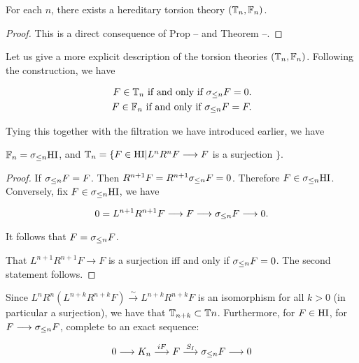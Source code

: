 \begin{cor}
For each $n$, there exists a hereditary torsion theory $(\mathbb{T}_n, 
\mathbb{F}_n)$.
\end{cor}

\begin{proof}
This is a direct consequence of Prop -- and Theorem --.
\end{proof}

Let us give a more explicit description of the torsion theories 
$(\mathbb{T}_n, \mathbb{F}_n)$. Following the construction, we have

\begin{align*}\label{f0}
F \in \mathbb{T}_n \textrm{ if and only if } \sigma_{\leq n} F = 0. \\
F \in \mathbb{F}_n \textrm{ if and only if } \sigma_{\leq n} F = F.
\end{align*}

Tying this together with the filtration we have introduced 
earlier, we have

\begin{prop}
$\mathbb{F}_n = \sigma_{\leq n} \mathrm{HI}$, and $\mathbb{T}_n = \{F \in \mathrm{HI} | L^nR^nF 
\longrightarrow F$ is a surjection $\}$.
\end{prop}

\begin{proof}
If $\sigma_{\leq n}F = F$. Then $R^{n+1}F=R^{n+1}\sigma_{\leq n}F=0$. Therefore 
$F \in \sigma_{\leq n} \mathrm{HI}$. Conversely, fix $F \in \sigma_{\leq n} \mathrm{HI}$, we have

\begin{equation}
0 = L^{n+1}R^{n+1}F \longrightarrow F \longrightarrow \sigma_{\leq n}F 
\longrightarrow 0.
\end{equation}

It follows that $F= \sigma_{\leq n}F$.

That $L^{n+1}R^{n+1}F \longrightarrow F$ is a surjection iff and 
only if $\sigma_{\leq n}F = 0$. The second statement follows.
\end{proof}

Since $L^nR^n(L^{n+k}R^{n+k}F) \stackrel{\sim}{\longrightarrow}
L^{n+k}R^{n+k} F$ is an isomorphism for all $k > 0$ (in particular 
a surjection), we have that $\mathbb{T}_{n+k} \subset \mathbb{T}{n}$. 
Furthermore, for $F \in \mathrm{HI}$, for $F \longrightarrow \sigma_{\leq n} F$, 
complete to an exact sequence:

\begin{equation}
0 \longrightarrow K_n \stackrel{iF}{\longrightarrow} F 
\stackrel{S_I}{\longrightarrow} \sigma_{\leq n}F \longrightarrow 0
\end{equation}

